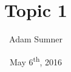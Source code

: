 \documentclass[12pt]{article}
\title{\textbf{Topic 1}}
\author{Adam Sumner}
\date{May 6\textsuperscript{th}, 2016}
\begin{document}
\maketitle


\section{}
\end{document}
